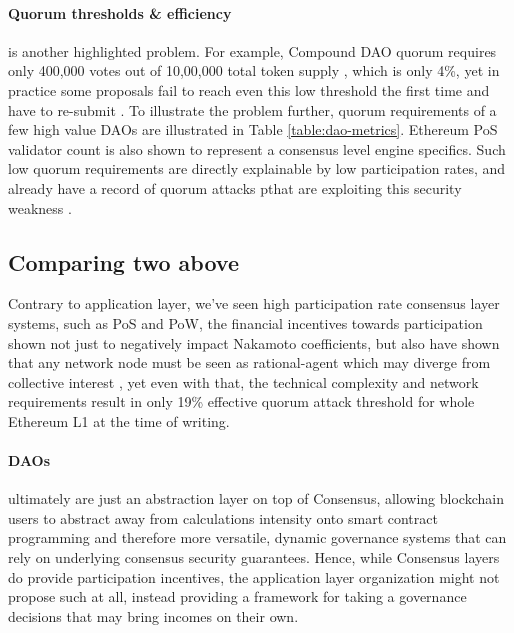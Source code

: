 \documentclass{article}
\begin{document}
\begin{CJK}{UTF8}{gbsn}
\begin{multicols}{2}
        \paragraph{Quorum thresholds \& efficiency} is another highlighted problem. For example, Compound DAO quorum requires only 400,000 \cite{CompDAO} votes out of 10,00,000 total token supply \cite{CompToken}, which is only 4\%, yet in practice some proposals fail to reach even this low threshold the first time and have to re-submit \cite{CompProp232}\cite{CompProp237}. To illustrate the problem further, quorum requirements of a few high value DAOs are illustrated in Table \ref*{table:dao-metrics}. Ethereum PoS validator count is also shown to represent a consensus level engine specifics. Such low quorum requirements are directly explainable by low participation rates, and already have a record of quorum attacks pthat are exploiting this security weakness \cite{AragonBlog}\cite{rhizoo2023}.
        
        \subsection{Comparing two above}
        Contrary to application layer, we've seen high participation rate consensus layer systems, such as PoS and PoW, the financial incentives towards participation shown not just to negatively impact  Nakamoto coefficients, but also have shown that any network node must be seen as rational-agent which may diverge from collective interest \cite{Philip2019}, yet even with that, the technical complexity and network requirements result in only 19\% effective quorum attack threshold for whole Ethereum L1 at the time of writing.

        \paragraph*{DAOs} ultimately are just an abstraction layer on top of Consensus, allowing blockchain users to abstract away from calculations intensity onto smart contract programming and therefore more versatile, dynamic governance systems that can rely on underlying consensus security guarantees. Hence, while Consensus layers do provide participation incentives, the application layer organization might not propose such at all, instead providing a framework for taking a governance decisions that may bring incomes on their own.

\end{multicols}
\end{CJK}
\end{document}
